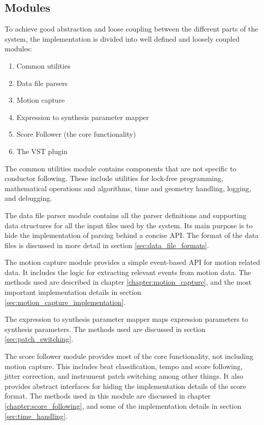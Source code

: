 \subsection{Modules}

To achieve good abstraction and loose coupling
between the different parts of the system,
the implementation is divided into 
well defined and loosely coupled modules:
\begin{enumerate}
\item Common utilities
\item Data file parsers
\item Motion capture
\item Expression to synthesis parameter mapper
\item Score Follower (the core functionality)
\item The VST plugin \label{item:last_implementation_module}
\end{enumerate}
The common utilities module contains components
that are not specific to conductor following.
These include utilities for
lock-free programming,
mathematical operations and algorithms,
time and geometry handling,
logging, and debugging.

The data file parser module
contains all the parser definitions
and supporting data structures
for all the input files used by the system.
Its main purpose is to hide the implementation
of parsing behind a concise API.
The format of the data files is discussed in more detail
in section \ref{sec:data_file_formats}.

The motion capture module provides a simple
event-based API for motion related data.
It includes the logic for extracting relevant events from motion data.
The methods used are described in
chapter \ref{chapter:motion_capture},
and the most important implementation details in
section \ref{sec:motion_capture_implementation}.

The expression to synthesis parameter mapper
maps expression parameters to synthesis parameters.
The methods used are discussed in section
\ref{sec:patch_switching}.

The score follower module provides most of the core functionality,
not including motion capture.
This includes
beat classification, tempo and score following, jitter correction,
and instrument patch switching among other things.
It also provides abstract interfaces for 
hiding the implementation details of the score format.
The methods used in this module are discussed
in chapter \ref{chapter:score_following},
and some of the implementation details
in section \ref{sec:time_handling}.


